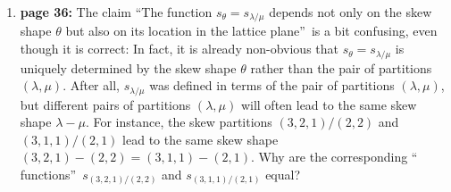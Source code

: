 \documentclass[numbers=enddot,12pt,final,onecolumn,notitlepage]{scrartcl}%
\theoremstyle{definition}
\let\sumnonlimits\sum
\renewcommand{\sum}{\sumnonlimits\limits}
\begin{document}
\begin{enumerate}
\begin{align*}
\end{align*}
Comparing this with%
\[
\det\left(  \varphi^{1-j}\left(  h_{1-i+j}\right)  \right)  _{i,j\in\left[
r\right]  }=e_{r}\ \ \ \ \ \ \ \ \ \ \left(  \text{by the definition of }%
e_{r}=s_{\left(  1^{r}\right)  }\right)  ,
\]
we find%
\begin{equation}
e_{r}=\sum_{j=1}^{r}\left(  -1\right)  ^{j+1}\varphi^{1-j}\left(
h_{j}\right)  \varphi^{-j}\left(  e_{r-j}\right)  . \label{p36.9.3.5}%
\end{equation}
Thus,%
\begin{align*}
&  \sum_{j=0}^{r}\left(  -1\right)  ^{j}\varphi^{1-j}\left(  h_{j}\right)
\varphi^{-j}\left(  e_{r-j}\right) \\
&  =\underbrace{\left(  -1\right)  ^{0}}_{=1}\varphi^{1-0}\left(
\underbrace{h_{0}}_{=1}\right)  \underbrace{\varphi^{-0}}_{=\operatorname*{id}%
}\left(  \underbrace{e_{r-0}}_{=e_{r}}\right)  +\sum_{j=1}^{r}%
\underbrace{\left(  -1\right)  ^{j}}_{=-\left(  -1\right)  ^{j+1}}%
\varphi^{1-j}\left(  h_{j}\right)  \varphi^{-j}\left(  e_{r-j}\right) \\
&  =\underbrace{\varphi^{1-0}\left(  1\right)  }_{=1}e_{r}-\underbrace{\sum
_{j=1}^{r}\left(  -1\right)  ^{j+1}\varphi^{1-j}\left(  h_{j}\right)
\varphi^{-j}\left(  e_{r-j}\right)  }_{\substack{=e_{r}\\\text{(by
(\ref{p36.9.3.5}))}}}=e_{r}-e_{r}=0,
\end{align*}
and so the equality (1) is proved.

\item \textbf{page 36:} The claim \textquotedblleft The function $s_{\theta
}=s_{\lambda/\mu}$ depends not only on the skew shape $\theta$ but also on its
location in the lattice plane\textquotedblright\ is a bit confusing, even
though it is correct: In fact, it is already non-obvious that $s_{\theta
}=s_{\lambda/\mu}$ is uniquely determined by the skew shape $\theta$ rather
than the pair of partitions $\left(  \lambda,\mu\right)  $. After all,
$s_{\lambda/\mu}$ was defined in terms of the pair of partitions $\left(
\lambda,\mu\right)  $, but different pairs of partitions $\left(  \lambda
,\mu\right)  $ will often lead to the same skew shape $\lambda-\mu$. For
instance, the skew partitions $\left(  3,2,1\right)  /\left(  2,2\right)  $
and $\left(  3,1,1\right)  /\left(  2,1\right)  $ lead to the same skew shape
$\left(  3,2,1\right)  -\left(  2,2\right)  =\left(  3,1,1\right)  -\left(
2,1\right)  $. Why are the corresponding \textquotedblleft
functions\textquotedblright\ $s_{\left(  3,2,1\right)  /\left(  2,2\right)  }$
and $s_{\left(  3,1,1\right)  /\left(  2,1\right)  }$ equal?


\end{enumerate}
\end{document}
